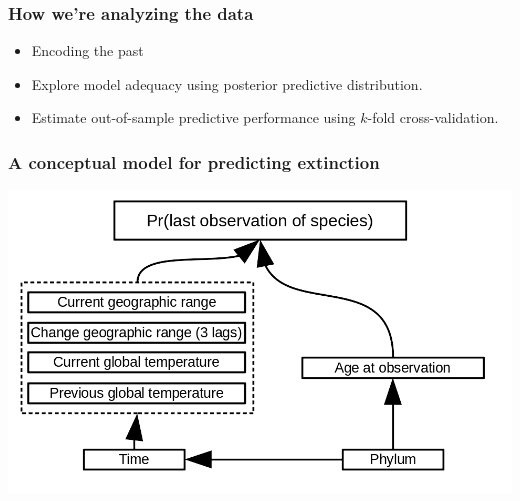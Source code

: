 \documentclass[aspectratio=169]{beamer}
\begin{document}
\begin{frame}
  \frametitle{How we're analyzing the data}

  \begin{Large}
    \begin{itemize}%
      \item Encoding the past
        \begin{itemize}
        \end{itemize}
      \item Explore model adequacy using posterior predictive distribution.
      \item Estimate out-of-sample predictive performance using \(k\)-fold cross-validation.
    \end{itemize}
  \end{Large}

\end{frame}


\begin{frame}
  \frametitle{A conceptual model for predicting extinction}

  \begin{center}
    \includegraphics[width=\textwidth,height=\textheight,keepaspectratio=true]{figure/conceptual_diagram}
  \end{center}

\end{frame}
\end{document}
